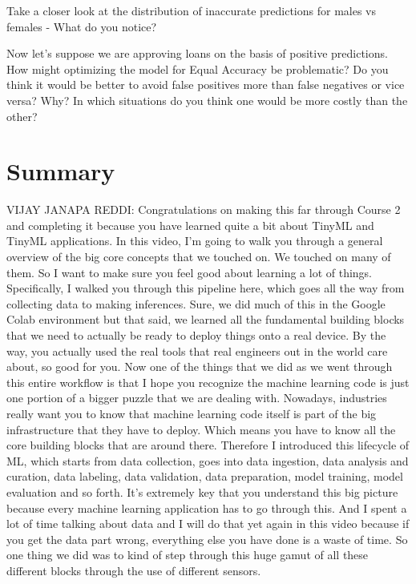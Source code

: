 Take a closer look at the distribution of inaccurate predictions for males vs females - What do you notice? 

Now let’s suppose we are approving loans on the basis of positive predictions. How might optimizing the model for Equal Accuracy be problematic? Do you think it would be better to avoid false positives more than false negatives or vice versa? Why? In which situations do you think one would be more costly than the other?
  

\section{Summary}

VIJAY JANAPA REDDI: Congratulations on making this far through Course 2
and completing it because you have learned quite a bit
about TinyML and TinyML applications.
In this video, I'm going to walk you through a general overview
of the big core concepts that we touched on.
We touched on many of them.
So I want to make sure you feel good about learning a lot of things.
Specifically, I walked you through this pipeline
here, which goes all the way from collecting data to making inferences.
Sure, we did much of this in the Google Colab environment but that said,
we learned all the fundamental building blocks
that we need to actually be ready to deploy things onto a real device.
By the way, you actually used the real tools
that real engineers out in the world care about, so good for you.
Now one of the things that we did as we went through this entire workflow
is that I hope you recognize the machine learning code is just
one portion of a bigger puzzle that we are dealing with.
Nowadays, industries really want you to know that machine learning code
itself is part of the big infrastructure that they have to deploy.
Which means you have to know all the core building
blocks that are around there.
Therefore I introduced this lifecycle of ML, which starts from data collection,
goes into data ingestion, data analysis and curation, data labeling, data
validation, data preparation, model training, model evaluation
and so forth.
It's extremely key that you understand this big picture
because every machine learning application has to go through this.
And I spent a lot of time talking about data
and I will do that yet again in this video
because if you get the data part wrong, everything else you have done
is a waste of time.
So one thing we did was to kind of step through this huge gamut
of all these different blocks through the use of different sensors.

